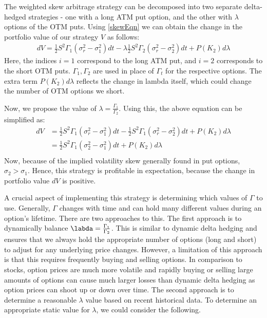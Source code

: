 \documentclass[10pt]{article}
\theoremstyle{definition}
\begin{document}
The weighted skew arbitrage strategy can be decomposed into two separate delta-hedged strategies - one with a long ATM put option, and the other with $\lambda$ options of the OTM puts. Using \ref{skewEqn} we can obtain the change in the portfolio value of our strategy $V$ as follows:
\begin{align*}
    d V = \frac12 S^2 \Gamma_1 (\sigma_r^2 - \sigma_1^2) d t - \lambda \frac12 S^2 \Gamma_2 (\sigma_r^2 - \sigma_2^2) d t + P(K_2) d \lambda
\end{align*}
Here, the indices $i=1$ correspond to the long ATM put, and $i=2$ corresponds to the short OTM puts. $\Gamma_1, \Gamma_2$ are used in place of $\Gamma_t$ for the respective options. The extra term $P(K_2) d \lambda$ reflects the change in lambda itself, which could change the number of OTM options we short. 

Now, we propose the value of $\lambda = \frac{\Gamma_1}{\Gamma_2}$. Using this, the above equation can be simplified as:
\begin{align*}
    d V &= \frac12 S^2 \Gamma_1 (\sigma_r^2 - \sigma_1^2) d t - \frac12 S^2 \Gamma_1 (\sigma_r^2 - \sigma_2^2) d t + P(K_2) d \lambda \\
    &= \frac12 S^2 \Gamma_1 (\sigma_2^2 - \sigma_1^2) d t + P(K_2) d \lambda \\
\end{align*}
Now, because of the implied volatility skew generally found in put options, $\sigma_2 > \sigma_1$. Hence, this strategy is profitable in expectation, because the change in portfolio value $d V$ is positive.

A crucial aspect of implementing this strategy is determining which values of $\Gamma$ to use. Generally, $\Gamma$ changes with time and can hold many different values during an option's lifetime. There are two approaches to this. The first approach is to dynamically balance $\labda = \frac{\Gamma_1}{\Gamma_2}$. This is similar to dynamic delta hedging and ensures that we always hold the appropriate number of options (long and short) to adjust for any underlying price changes. However, a limitation of this approach is that this requires frequently buying and selling options. In comparison to stocks, option prices are much more volatile and rapidly buying or selling large amounts of options can cause much larger losses than dynamic delta hedging as option prices can shoot up or down over time. The second approach is to determine a reasonable $\lambda$ value based on recent historical data. To determine an appropriate static value for $\lambda$, we could consider the following. 
\end{document}
